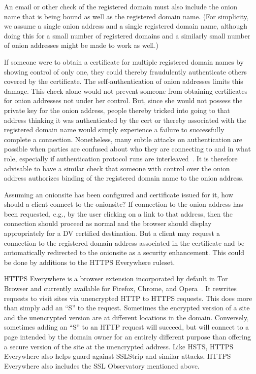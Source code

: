 \documentclass[10pt, conference, compsocconf]{styles/IEEEtran}
\begin{document}
An email or other check of the registered domain must also include the
onion name that is being bound as well as the registered domain name.
(For simplicity, we assume a single onion address and a single
registered domain name, although doing this for a small number of
registered domains and a similarly small number of onion addresses
might be made to work as well.)

If someone were to obtain a certificate for multiple registered domain
names by showing control of only one, they could thereby fraudulently
authenticate others covered by the certificate. The
self-authentication of onion addresses limits this damage.  This check
alone would not prevent someone from obtaining certificates for onion
addresses not under her control. But, since she would not possess the
private key for the onion address, people thereby tricked into going
to that address thinking it was authenticated by the cert or thereby
associated with the registered domain name would simply experience a
failure to successfully complete a connection. Nonetheless, many
subtle attacks on authentication are possible when parties are
confused about who they are connecting to and in what role, especially
if authentication protocol runs are interleaved~\cite{fosad00}.  It is
therefore advisable to have a similar check that someone with control
over the onion address authorizes binding of the registered domain
name to the onion address.



Assuming an onionsite has been configured and certificate issued for
it, how should a client connect to the onionsite? If connection
to the onion address has been requested, e.g., by the user
clicking on a link to that address, then the connection should
proceed as normal and the browser should display appropriately for a
DV certified destination. But a client may request a connection
to the registered-domain address associated in the certificate
and be automatically redirected to the onionsite as a security
enhancement. This could be done by additions to the HTTPS Everywhere
ruleset.

HTTPS Everywhere is a browser extension incorporated by default in Tor
Browser and currently available for Firefox, Chrome, and
Opera~\cite{https-everywhere}. It rewrites requests to visit sites via
unencrypted HTTP to HTTPS requests. This does more than simply add an
``S'' to the request. Sometimes the encrypted version of a site and
the unencrypted version are at different locations in the domain.
Conversely, sometimes adding an ``S'' to an HTTP request will
succeed, but will connect to a page intended by the domain owner for an
entirely different purpose than offering a secure version of the site
at the unencrypted address.  Like HSTS, HTTPS Everywhere also helps
guard against SSLStrip and similar attacks. HTTPS Everywhere
also includes the SSL Observatory mentioned above.
\end{document}
